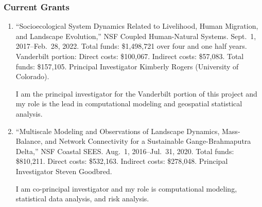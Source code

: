 %
%
\subsubsection{Current Grants}
\begin{enumerate}
	\item ``Socioecological System Dynamics Related to Livelihood, Human Migration, and Landscape Evolution,'' NSF Coupled Human-Natural Systems. Sept.~1, 2017--Feb.~28, 2022. Total funds: \$1,498,721 over four and one half years. Vanderbilt portion: Direct costs: \$100,067. Indirect costs: \$57,083. Total funds: \$157,105. Principal Investigator Kimberly Rogers (University of Colorado). 
	\begin{credit}
		I am the principal investigator for the Vanderbilt portion of this project and my role is the lead in computational modeling and geospatial statistical analysis.
	\end{credit}
	\item ``Multiscale Modeling and Observations of Landscape Dynamics, Mass-Balance, and Network Connectivity for a Sustainable Gange-Brahmaputra Delta,'' NSF Coastal SEES. Aug.~1, 2016--Jul.~31, 2020. Total funds: \$810,211. Direct costs: \$532,163. Indirect costs: \$278,048. Principal Investigator Steven Goodbred. 
	\begin{credit}		
		I am co-principal investigator and my role is computational modeling, statistical data analysis, and risk analysis.
	\end{credit}
\end{enumerate}
%
\iffalse
\subsubsection{Pending Grant Proposals}
\begin{enumerate}
\end{enumerate}
\fi 
%
